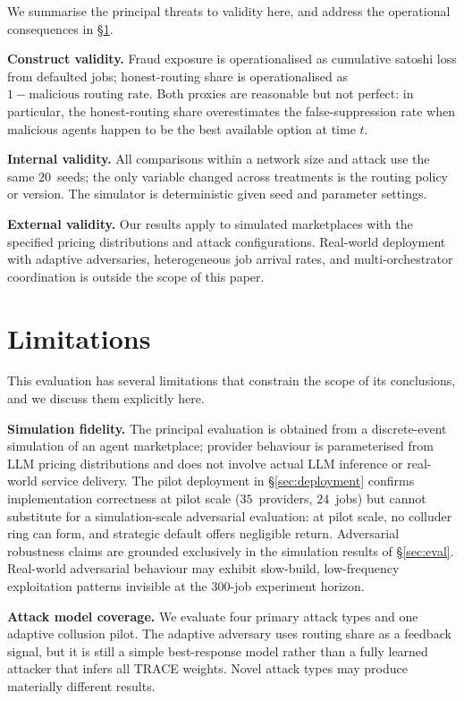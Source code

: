 \documentclass[sigconf,nonacm,10pt]{acmart}
\begin{document}
We summarise the principal threats to validity here, and address
the operational consequences in \S\ref{sec:limitations}.

\noindent\textbf{Construct validity.}
Fraud exposure is operationalised as cumulative satoshi loss from
defaulted jobs; honest-routing share is operationalised as
$1 - \text{malicious routing rate}$. Both proxies are reasonable
but not perfect: in particular, the honest-routing share
overestimates the false-suppression rate when malicious agents
happen to be the best available option at time $t$.

\noindent\textbf{Internal validity.}
All comparisons within a network size and attack use the same
$20$~seeds; the only variable changed across treatments is the
routing policy or version. The simulator is deterministic given
seed and parameter settings.

\noindent\textbf{External validity.}
Our results apply to simulated marketplaces with the specified
pricing distributions and attack configurations. Real-world
deployment with adaptive adversaries, heterogeneous job arrival
rates, and multi-orchestrator coordination is outside the scope
of this paper.

\section{Limitations}
\label{sec:limitations}

This evaluation has several limitations that constrain the scope
of its conclusions, and we discuss them explicitly here.

\noindent\textbf{Simulation fidelity.}
The principal evaluation is obtained from a discrete-event simulation of
an agent marketplace; provider behaviour is parameterised from LLM
pricing distributions and does not involve actual LLM inference or
real-world service delivery. The pilot deployment in
\S\ref{sec:deployment} confirms implementation correctness at pilot
scale ($35$~providers, $24$~jobs) but cannot substitute for a
simulation-scale adversarial evaluation: at pilot scale, no colluder ring can form, and strategic
default offers negligible return. Adversarial robustness claims are
grounded exclusively in the simulation results of \S\ref{sec:eval}.
Real-world adversarial behaviour may exhibit slow-build, low-frequency
exploitation patterns invisible at the $300$-job experiment horizon.

\noindent\textbf{Attack model coverage.}
We evaluate four primary attack types and one adaptive collusion pilot.
The adaptive adversary uses routing share as a feedback signal, but it
is still a simple best-response model rather than a fully learned
attacker that infers all TRACE weights. Novel attack types may produce
materially different results.
\end{document}
